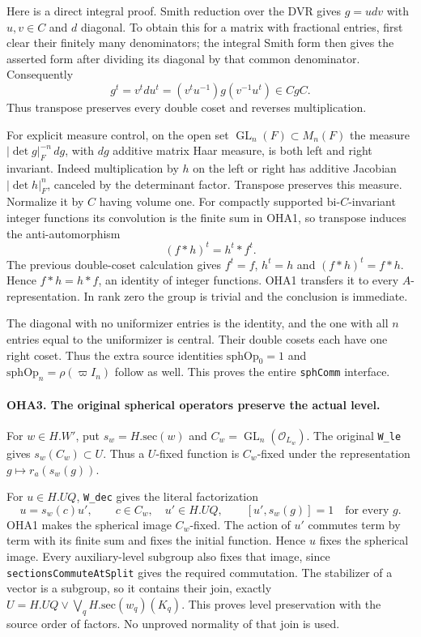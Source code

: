 \documentclass[11pt,a4paper]{article}
\numberwithin{equation}{section}
\theoremstyle{remark}\newtheorem{remark}[theorem]{Remark}
\begin{document}
Here is a direct integral proof. Smith reduction over the DVR
gives \(g=u d v\) with \(u,\allowbreak{} v\in C\) and \(d\) diagonal. To obtain
this for a matrix with fractional entries, first clear their
finitely many denominators; the integral Smith form then gives
the asserted form after dividing its diagonal by that common
denominator. Consequently
\[
       g^t=v^t d u^t
          =(v^tu^{-1})g(v^{-1}u^t)\in CgC .
\]
Thus transpose preserves every double coset and reverses
multiplication.

For explicit measure control, on the open set
\(\operatorname{GL}_n(F)\subset M_n(F)\) the measure
\(|\det g|_F^{-n}\,\allowbreak{} dg\), with \(dg\) additive matrix Haar
measure, is both left and right invariant. Indeed multiplication
by \(h\) on the left or right has additive Jacobian
\(|\det h|_F^n\), canceled by the determinant factor.
Transpose preserves this measure. Normalize it by \(C\) having
volume one. For compactly supported bi-\(C\)-invariant integer
functions its convolution is the finite sum in OHA1, so
transpose induces the anti-automorphism
\[
                       (f*h)^t=h^t*f^t .
\]
The previous double-coset calculation gives \(f^t=f\), \(h^t=h\)
and \((f*h)^t=f*h\). Hence \(f*h=h*f\), an identity of integer
functions. OHA1 transfers it to every \(A\)-representation.
In rank zero the group is trivial and the conclusion is immediate.

The diagonal with no uniformizer entries is the identity, and
the one with all \(n\) entries equal to the uniformizer is central.
Their double cosets each have one right coset. Thus the extra
source identities \(\mathrm{sphOp}_0=1\) and
\(\mathrm{sphOp}_n=\rho(\varpi I_n)\) follow as well.
This proves the entire \texttt{sph\allowbreak Comm} interface.

\paragraph{OHA3. The original spherical operators preserve the actual level.}
\label{claim:OHA3}
For \(w\in H.W'\), put \(s_w=H.\mathrm{sec}(w)\) and
\(C_w=\operatorname{GL}_n(\mathcal O_{L_w})\).
The original \texttt{W\_\allowbreak le} gives \(s_w(C_w)\subset U\).
Thus a \(U\)-fixed function is \(C_w\)-fixed under the
representation \(g\mapsto r_a(s_w(g))\).

For \(u\in H.UQ\), \texttt{W\_\allowbreak dec} gives the literal factorization
\[
          u=s_w(c)u',\qquad c\in C_w,\quad u'\in H.UQ,
          \qquad [u',\allowbreak{} s_w(g)]=1\quad\text{for every }g .
\]
OHA1 makes the spherical image \(C_w\)-fixed. The action of
\(u'\) commutes term by term with its finite sum and fixes the
initial function. Hence \(u\) fixes the spherical image.
Every auxiliary-level subgroup also fixes that image, since
\texttt{sections\allowbreak Commute\allowbreak At\allowbreak Split} gives the required commutation.
The stabilizer of a vector is a subgroup, so it contains their
join, exactly \(U=H.UQ\vee\bigvee_q H.\mathrm{sec}(w_q)(K_q)\).
This proves level preservation with the source order of factors.
No unproved normality of that join is used.
\end{document}
